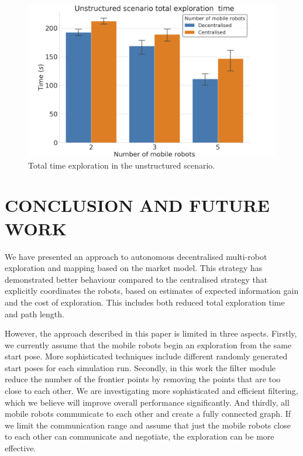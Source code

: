 \documentclass[letterpaper, 10 pt, conference]{ieeeconf}  %
\begin{document}
\begin{figure}[t]
	\centering\includegraphics[width=0.9\columnwidth]{unstructured_tt.png}
	\caption{Total time exploration in the unstructured scenario.}
	\label{fig:unstruc_tt}
\end{figure}


\section{CONCLUSION AND FUTURE WORK}

We have presented an approach to autonomous decentralised multi-robot
exploration and mapping based on the market model. This strategy has demonstrated better behaviour compared to the centralised strategy that explicitly coordinates the robots, based on estimates of expected information gain and the cost of exploration. This includes both reduced total exploration time and path length.

However, the approach described in this paper is limited in three aspects. Firstly, we currently assume that the mobile robots begin an exploration from the same start pose. More sophisticated techniques include different randomly generated start poses for each simulation run. Secondly, in this work the filter module reduce the number of the frontier points by removing the points that are too close to each other. We are investigating more sophisticated and efficient filtering, which we believe will improve overall performance significantly. And thirdly, all mobile robots communicate to each other and create a fully connected graph. If we limit the communication range and assume that just the mobile robots close to each other can communicate and negotiate, the exploration can be more effective. 

\addtolength{\textheight}{-12cm}   %
\end{document}
